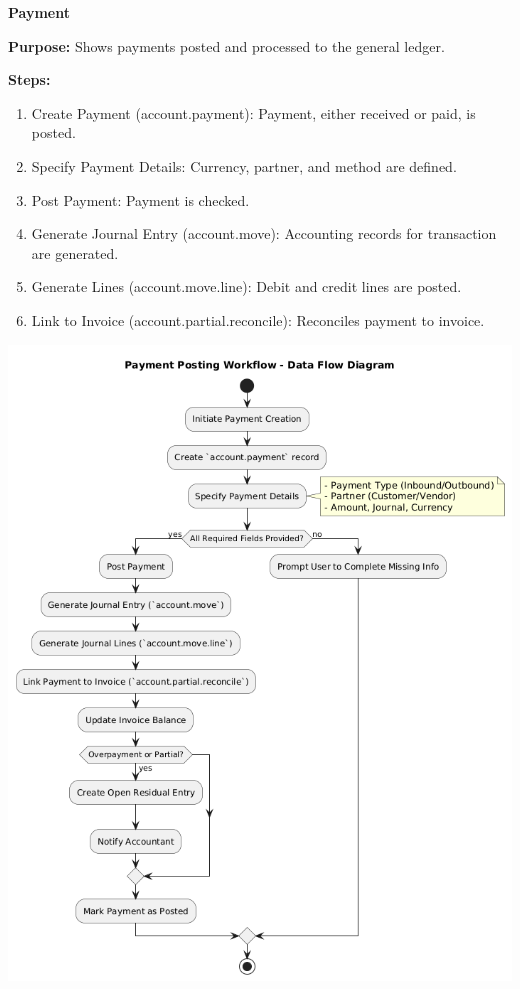 \documentclass[11pt,a4paper]{article}
\begin{document}
\newpage
\noindent\textbf{Payment}
\medskip

\begin{minipage}{0.45\textwidth}
    \noindent\textbf{Purpose:} Shows payments 
    posted and processed to the 
    general ledger.
    \medskip
    
    \noindent\textbf{Steps:}
\begin{enumerate}
    \item Create Payment (account.payment): Payment, 
    either received or paid, is 
    posted.
    \item Specify Payment Details: 
    Currency, partner, and method 
    are defined.
    \item Post Payment: Payment is 
    checked.
    \item Generate Journal Entry 
    (account.move): Accounting 
    records for transaction are 
    generated.
    \item Generate Lines 
    (account.move.line): Debit and 
    credit lines are posted.
    \item Link to Invoice (account.partial.reconcile): Reconciles payment to invoice.
\end{enumerate}
\end{minipage}%
\hfill
\begin{minipage}{0.45\textwidth}
    \centering
    \includegraphics[width=\linewidth]{diagram/payment-DFD.png}
\end{minipage}
\end{document}
